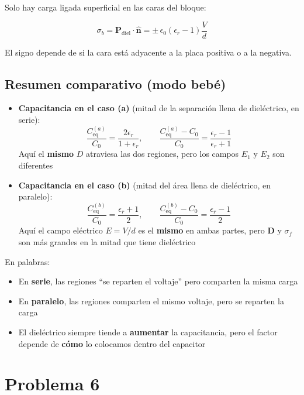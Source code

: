 \documentclass{article}
\begin{document}
Solo hay carga ligada superficial en las caras del bloque:

\begin{equation}
\sigma_{b} = \mathbf{P}_{\text{diel}}\cdot\hat{\mathbf{n}}
= \pm\,\epsilon_{0}(\epsilon_{r}-1)\frac{V}{d}
\label{eq:sigma-b-b}
\end{equation}

El signo depende de si la cara está adyacente a la placa positiva o a la negativa.

\subsection*{Resumen comparativo (modo bebé)}

\begin{itemize}
  \item \textbf{Capacitancia en el caso (a)} (mitad de la separación llena de dieléctrico, en serie):
  \[
  \frac{C_{\text{eq}}^{(a)}}{C_{0}} = \frac{2\epsilon_{r}}{1+\epsilon_{r}},
  \qquad
  \frac{C_{\text{eq}}^{(a)} - C_{0}}{C_{0}} = \frac{\epsilon_{r}-1}{\epsilon_{r}+1}
  \]
  Aquí el \textbf{mismo} $D$ atraviesa las dos regiones, pero los campos $E_{1}$ y $E_{2}$ son diferentes

  \item \textbf{Capacitancia en el caso (b)} (mitad del área llena de dieléctrico, en paralelo):
  \[
  \frac{C_{\text{eq}}^{(b)}}{C_{0}} = \frac{\epsilon_{r}+1}{2},
  \qquad
  \frac{C_{\text{eq}}^{(b)} - C_{0}}{C_{0}} = \frac{\epsilon_{r}-1}{2}
  \]
  Aquí el campo eléctrico $E = V/d$ es el \textbf{mismo} en ambas partes, pero $\mathbf{D}$ y $\sigma_{f}$ son más grandes en la mitad que tiene dieléctrico
\end{itemize}

En palabras:
\begin{itemize}
  \item En \textbf{serie}, las regiones “se reparten el voltaje” pero comparten la misma carga
  \item En \textbf{paralelo}, las regiones comparten el mismo voltaje, pero se reparten la carga
  \item El dieléctrico siempre tiende a \textbf{aumentar} la capacitancia, pero el factor depende de \textbf{cómo} lo colocamos dentro del capacitor
\end{itemize}


\section{Problema 6}
\end{document}
